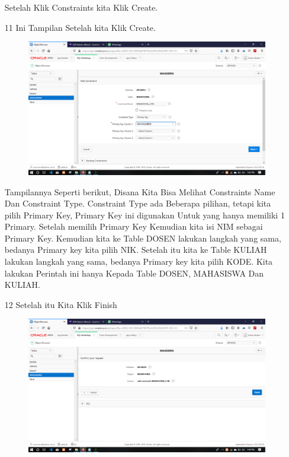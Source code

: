 \begin{enumerate}
\par
Setelah Klik Constraints kita Klik Create.

\newpage
\item[11]Ini Tampilan Setelah kita Klik Create.

\begin{figure}[!htbp]
    \begin{center}
    \includegraphics[scale=0.2]{figures/12.png}
    \end{center}   
    \end{figure}
    
\par
Tampilannya Seperti berikut, Disana Kita Bisa Melihat Constraints Name Dan Constraint Type. Constraint Type ada Beberapa pilihan, tetapi kita pilih Primary Key, Primary Key ini digunakan Untuk yang hanya memiliki 1 Primary. Setelah memilih Primary Key Kemudian kita isi NIM sebagai Primary Key. Kemudian kita ke Table DOSEN lakukan langkah yang sama, bedanya Primary key kita pilih NIK. Setelah itu kita ke Table KULIAH lakukan langkah yang sama, bedanya Primary key kita pilih KODE. Kita lakukan Perintah ini hanya Kepada Table DOSEN, MAHASISWA Dan KULIAH.

\item[12]Setelah itu Kita Klik Finish

\begin{figure}[!htbp]
    \begin{center}
    \includegraphics[scale=0.2]{figures/15.png}
    \end{center}   
    \end{figure}
    

\end{enumerate}

